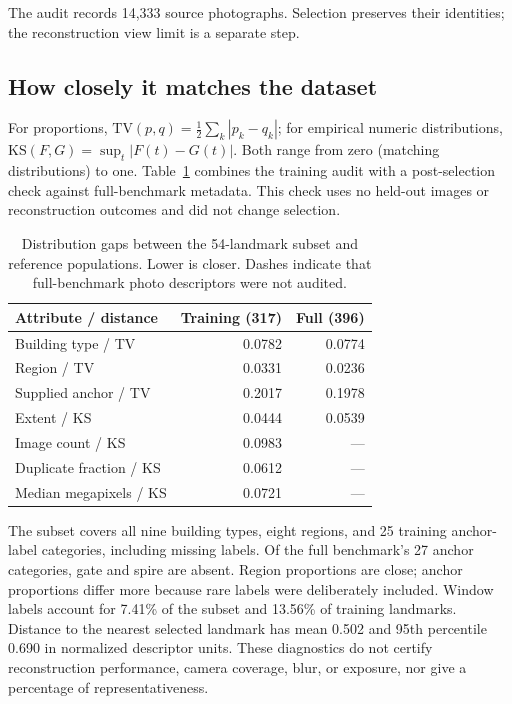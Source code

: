\documentclass[sigconf,nonacm]{acmart}
\begin{document}
The audit records 14,333 source photographs. Selection preserves their identities; the reconstruction view limit is a separate step.

\subsection{How closely it matches the dataset}
For proportions, $\mathrm{TV}(p,q)=\tfrac12\sum_k|p_k-q_k|$; for empirical numeric distributions, $\mathrm{KS}(F,G)=\sup_t|F(t)-G(t)|$. Both range from zero (matching distributions) to one. Table~\ref{tab:subset} combines the training audit with a post-selection check against full-benchmark metadata. This check uses no held-out images or reconstruction outcomes and did not change selection.

\begin{table}[htb]
\caption{Distribution gaps between the 54-landmark subset and reference populations. Lower is closer. Dashes indicate that full-benchmark photo descriptors were not audited.}
\label{tab:subset}
\centering
\begin{tabular}{lrr}
\toprule
Attribute / distance & Training (317) & Full (396)\\
\midrule
Building type / TV & 0.0782 & 0.0774\\
Region / TV & 0.0331 & 0.0236\\
Supplied anchor / TV & 0.2017 & 0.1978\\
Extent / KS & 0.0444 & 0.0539\\
Image count / KS & 0.0983 & ---\\
Duplicate fraction / KS & 0.0612 & ---\\
Median megapixels / KS & 0.0721 & ---\\
\bottomrule
\end{tabular}
\end{table}

The subset covers all nine building types, eight regions, and 25 training anchor-label categories, including missing labels. Of the full benchmark's 27 anchor categories, gate and spire are absent. Region proportions are close; anchor proportions differ more because rare labels were deliberately included. Window labels account for 7.41\% of the subset and 13.56\% of training landmarks. Distance to the nearest selected landmark has mean 0.502 and 95th percentile 0.690 in normalized descriptor units. These diagnostics do not certify reconstruction performance, camera coverage, blur, or exposure, nor give a percentage of representativeness.
\end{document}
